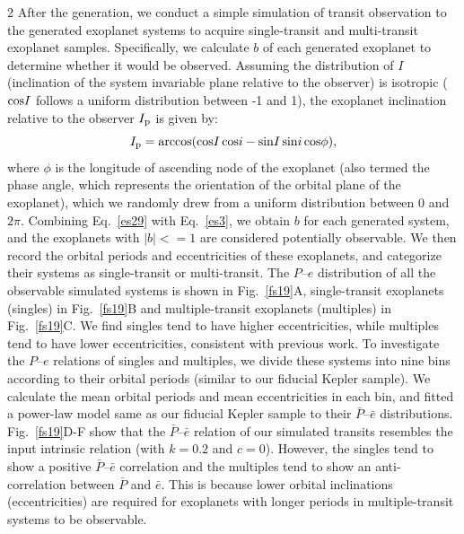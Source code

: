 \documentclass[10pt]{article}
\begin{document}
\begin{multicols}{2}
After the generation, we conduct a simple simulation of transit observation to the generated exoplanet systems to acquire single-transit and multi-transit exoplanet samples.
Specifically, we calculate $b$ of each generated exoplanet to determine whether it would be observed.
Assuming the distribution of $I$ (inclination of the system invariable plane relative to the observer) is isotropic (${\rm cos}I$ follows a uniform distribution between -1 and 1), the exoplanet inclination relative to the observer $I_{\rm p}$ is given by\cite{2018ApJ...860..101Z}:
\begin{equation}
\label{es29}
I_{\rm p} = {\rm arccos}({\rm cos}I\,{\rm cos}i-{\rm sin}I\,{\rm sin}i\,{\rm cos}\phi),
\end{equation}
where $\phi$ is the longitude of ascending node of the exoplanet (also termed the phase angle, which represents the orientation of the orbital plane of the exoplanet), which we randomly drew from a uniform distribution between 0 and $2\pi$.
Combining Eq.~\ref{es29} with Eq.~\ref{es3}, we obtain $b$ for each generated system, and the exoplanets with $|b|<=1$ are considered potentially observable.
We then record the orbital periods and eccentricities of these exoplanets, and categorize their systems as single-transit or multi-transit.
The $P$--$e$ distribution of all the observable simulated systems is shown in Fig.~\ref{fs19}A, single-transit exoplanets (singles) in Fig.~\ref{fs19}B and multiple-transit exoplanets (multiples) in Fig.~\ref{fs19}C.
We find singles tend to have higher eccentricities, while multiples tend to have lower eccentricities, consistent with previous work\cite{2015ApJ...808..126V,2016PNAS..11311431X,2019AJ....157...61V}.
To investigate the $P$--$e$ relations of singles and multiples, we divide these systems into nine bins according to their orbital periods (similar to our fiducial Kepler sample).
We calculate the mean orbital periods and mean eccentricities in each bin, and fitted a power-law model same as our fiducial Kepler sample to their $\bar{P}$--$\bar{e}$ distributions.
Fig.~\ref{fs19}D-F show that the $\bar{P}$--$\bar{e}$ relation of our simulated transits resembles the input intrinsic relation (with $k=0.2$ and $c=0$).
However, the singles tend to show a positive $\bar{P}$--$\bar{e}$ correlation and the multiples tend to show an anti-correlation between $\bar{P}$ and $\bar{e}$.
This is because lower orbital inclinations (eccentricities) are required for exoplanets with longer periods in multiple-transit systems to be observable.


\end{multicols}
\end{document}
